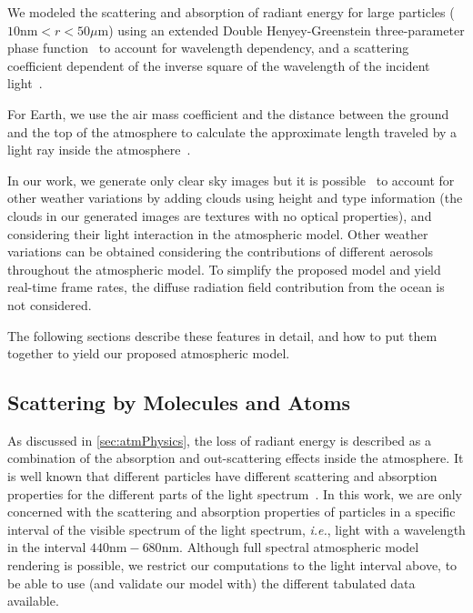 \documentclass[journal]{vgtc}                %
\begin{document}
We modeled the scattering and absorption of radiant energy for large particles ($10\text{nm} < r < 50\mu \text{m}$) using an extended Double Henyey-Greenstein three-parameter phase function~\cite{Kattawar:1975} to account for wavelength dependency, and a scattering coefficient dependent of the inverse square of the wavelength of the incident light~\cite{Hulst:1981}.

For Earth, we use the air mass coefficient and the distance between the ground and the top of the atmosphere to calculate the approximate length traveled by a light ray inside the atmosphere~\cite{Pickering:2002}.

In our work, we generate only clear sky images but it is possible~\cite{Schneider:2015} to account for other weather variations by adding clouds using height and type information (the clouds in our generated images are textures with no optical properties), and considering their light interaction in the atmospheric model. Other weather variations can be obtained considering the contributions of different aerosols throughout the atmospheric model. 
To simplify the proposed model and yield real-time frame rates, the diffuse radiation field contribution from the ocean is not considered.

The following sections describe these features in detail, and how to put them together to yield our proposed atmospheric model.  

\subsection{Scattering by Molecules and Atoms}

As discussed in \autoref{sec:atmPhysics}, the loss of radiant energy is described as a combination of the absorption and out-scattering effects inside the atmosphere. It is well known that different particles have different scattering and absorption properties for the different parts of the light spectrum~\cite{Chandrasekhar:1960, Hulst:1981, Bohren:1983, Thomas:2017, Keller:2013}. In this work, we are only concerned with the scattering and absorption properties of particles in a specific interval of the visible spectrum of the light spectrum, \textit{i.e.}, light with a wavelength in the interval $440\text{nm}-680\text{nm}$. Although full spectral atmospheric model rendering is possible, we restrict our computations to the light interval above, to be able to use (and validate our model with) the different tabulated data available.\\
\end{document}

